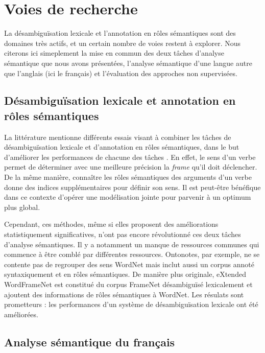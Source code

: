 \section{Voies de recherche}

La désambiguïsation lexicale et l'annotation en rôles sémantiques sont des
domaines très actifs, et un certain nombre de voies restent à explorer. Nous
citerons ici simeplement la mise en commun des deux tâches d'analyse sémantique
que nous avons présentées, l'analyse sémantique d'une langue autre que
l'anglais (ici le français) et l'évaluation des approches non supervisées.

\subsection{Désambiguïsation lexicale et annotation en rôles sémantiques}

La littérature mentionne différents essais visant à combiner les tâches de
désambiguïsation lexicale et d'annotation en rôles sémantiques, dans le but
d'améliorer les performances de chacune des tâches
\citep{dang2005role,moreda2006role,che2010jointly}. En effet, le sens d'un
verbe permet de déterminer avec une meilleure précision la \textit{frame} qu'il
doit déclencher. De la même manière, connaître les rôles sémantiques des
arguments d'un verbe donne des indices supplémentaires pour définir son sens.
Il est peut-être bénéfique dans ce contexte d'opérer une modélisation jointe
pour parvenir à un optimum plus global.

Cependant, ces méthodes, même si elles proposent des améliorations
statistiquement significatives, n'ont pas encore révolutionné ces deux tâches
d'analyse sémantiques. Il y a notamment un manque de ressources communes qui
commence à être comblé par différentes ressources. Ontonotes, par exemple, ne
se contente pas de regrouper des sens WordNet mais inclut aussi un corpus
annoté syntaxiquement et en rôles sémantiques. De manière plus originale,
eXtended WordFrameNet \citep{laparra2010extended} est constitué du corpus
FrameNet désambiguïsé lexicalement et ajoutent des informations de rôles
sémantiques à WordNet. Les résulats sont prometteurs : les performances d'un
système de désambiguïsation lexicale ont été améliorées.

\subsection{Analyse sémantique du français}

